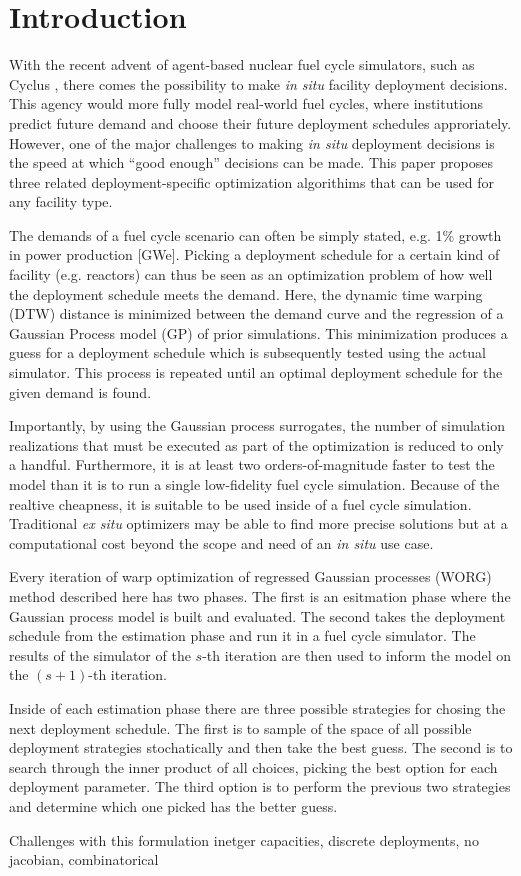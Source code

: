 \section{Introduction}
\label{intro}

With the recent advent of agent-based nuclear fuel cycle simulators, such as 
Cyclus \cite{DBLP:journals/corr/HuffGCFMOSSW15,cyclus_v1_0}, there comes the 
possibility to make \emph{in situ} facility deployment decisions. This 
agency would more fully model real-world fuel cycles, where institutions
predict future demand and choose their future deployment schedules 
approriately. However, one of the major challenges to making \emph{in situ}
deployment decisions is the speed at which ``good enough'' decisions can 
be made. This paper proposes three related deployment-specific optimization 
algorithims that can be used for any facility type.

The demands of a fuel cycle scenario can often be simply stated, e.g. 
1\% growth in power production [GWe]. Picking a deployment schedule for a 
certain kind of facility (e.g. reactors) can thus be seen as an optimization 
problem of how well the deployment schedule meets the demand. Here, the 
dynamic time warping (DTW) \cite{muller} distance is minimized 
between the demand curve and the regression of a Gaussian Process model (GP) 
\cite{rasmussen2006gaussian} of prior simulations. This minimization produces
a guess for a deployment schedule which is subsequently tested using 
the actual simulator. This process is repeated until an optimal deployment
schedule for the given demand is found.

Importantly, by using the Gaussian process surrogates, the number of 
simulation realizations that must be executed as part of the optimization is 
reduced to only a handful. Furthermore, it is at least two 
orders-of-magnitude faster to test the model than it is to run a single
low-fidelity fuel cycle simulation. Because of the realtive cheapness, it 
is suitable to be used inside of a fuel cycle simulation. Traditional
\emph{ex situ} optimizers may be able to find more precise solutions but at a
computational cost beyond the scope and need of an \emph{in situ} use case.

Every iteration of warp optimization of regressed Gaussian processes (WORG) 
method described here has two phases. The first is an esitmation phase where 
the Gaussian process model is built and evaluated. The second takes the 
deployment schedule from the estimation phase and run it in a fuel cycle 
simulator. The results of the simulator of the $s$-th iteration are then 
used to inform the model on the $(s+1)$-th iteration. 

Inside of each estimation phase there are three possible strategies for 
chosing the next deployment schedule.  The first is to sample of the 
space of all possible deployment strategies stochatically and then take the 
best guess.  The second is to search through the inner product of all choices,
picking the best option for each deployment parameter. The third option 
is to perform the previous two strategies and determine which one picked
has the better guess.


Challenges with this formulation
inetger capacities, discrete deployments, no jacobian, combinatorical